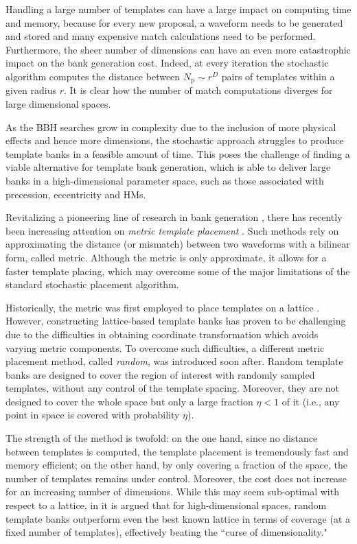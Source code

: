 \documentclass[twocolumn,showpacs,preprintnumbers,nofootinbib,prd,
superscriptaddress,10pt]{revtex4-2}
\begin{document}
Handling a large number of templates can have a large impact on computing time and memory, because for every new proposal, a waveform needs to be generated and stored and many expensive match calculations need to be performed.
Furthermore, the sheer number of dimensions can have an even more catastrophic impact on the bank generation cost. Indeed, at every iteration the stochastic algorithm computes the distance between $N_\text{p}\sim r^D$ pairs of templates within a given radius $r$. It is clear how the number of match computations diverges for large dimensional spaces.

As the BBH searches grow in complexity due to the inclusion of more physical effects and hence more dimensions, the stochastic approach struggles to produce template banks in a feasible amount of time.
This poses the challenge of finding a viable alternative for template bank generation, which is able to deliver large banks in a high-dimensional parameter space, such as those associated with precession, eccentricity and HMs.

Revitalizing a pioneering line of research in bank generation \cite{owen_metric, Messenger:2008ta, Prix:2007ks, Brown:2012qf, Keppel:2013uma}, there has recently been increasing attention on {\it metric template placement} \cite{Roy:2017oul, Roulet:2019hzy, Coogan:2022qxs, Hanna:2022zpk}.
Such methods rely on approximating the distance (or mismatch) between two waveforms with a bilinear form, called metric.
Although the metric is only approximate, it allows for a faster template placing, which may overcome some of the major limitations of the standard stochastic placement algorithm.

Historically, the metric was first employed to place templates on a lattice \cite{owen_metric, Prix:2007ks, Cokelaer:2007kx}. However, constructing lattice-based template banks has proven to be challenging due to the difficulties in  obtaining coordinate transformation which avoids varying metric components.
To overcome such difficulties, a different metric placement method, called {\it random}, was introduced \cite{Messenger:2008ta} soon after.
Random template banks are designed to cover the region of interest with randomly sampled templates, without any control of the template spacing. 
Moreover, they are not designed to cover the whole space but only a large fraction $\eta<1$ of it (i.e., any point in space is covered with probability $\eta$).

The strength of the method is twofold: on the one hand, since no distance between templates is computed, the template placement is tremendously fast and memory efficient; on the other hand, by only covering a fraction of the space, the number of templates remains under control.
Moreover, the cost does not increase for an increasing number of dimensions.
While this may seem sub-optimal with respect to a lattice, in \cite{Messenger:2008ta, Allen:2022lqr, Allen:2021yuy} it is argued that for high-dimensional spaces, random template banks outperform even the best known lattice in terms of coverage (at a fixed number of templates), effectively beating the ``curse of dimensionality."
\end{document}
